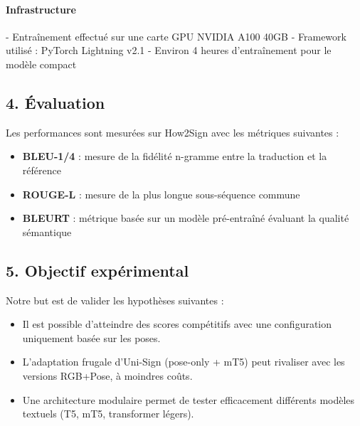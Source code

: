 \paragraph{Infrastructure}

- Entraînement effectué sur une carte GPU NVIDIA A100 40GB
- Framework utilisé : PyTorch Lightning v2.1
- Environ 4 heures d’entraînement pour le modèle compact

\subsection*{4. Évaluation}

Les performances sont mesurées sur How2Sign avec les métriques suivantes :
\begin{itemize}
    \item \textbf{BLEU-1/4} : mesure de la fidélité n-gramme entre la traduction et la référence
    \item \textbf{ROUGE-L} : mesure de la plus longue sous-séquence commune
    \item \textbf{BLEURT} : métrique basée sur un modèle pré-entraîné évaluant la qualité sémantique
\end{itemize}

\subsection*{5. Objectif expérimental}

Notre but est de valider les hypothèses suivantes :
\begin{itemize}
    \item Il est possible d’atteindre des scores compétitifs avec une configuration uniquement basée sur les poses.
    \item L’adaptation frugale d’Uni-Sign (pose-only + mT5) peut rivaliser avec les versions RGB+Pose, à moindres coûts.
    \item Une architecture modulaire permet de tester efficacement différents modèles textuels (T5, mT5, transformer légers).
\end{itemize}
